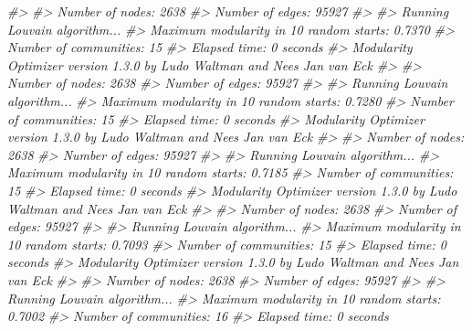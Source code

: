 \documentclass[
]{book}
\newenvironment{Shaded}{\begin{snugshade}}{\end{snugshade}}
\newcommand{\CommentTok}[1]{\textcolor[rgb]{0.56,0.35,0.01}{\textit{#1}}}
\begin{document}
\begin{Shaded}
\begin{Highlighting}[]
\CommentTok{\#\textgreater{} }
\CommentTok{\#\textgreater{} Number of nodes: 2638}
\CommentTok{\#\textgreater{} Number of edges: 95927}
\CommentTok{\#\textgreater{} }
\CommentTok{\#\textgreater{} Running Louvain algorithm...}
\CommentTok{\#\textgreater{} Maximum modularity in 10 random starts: 0.7370}
\CommentTok{\#\textgreater{} Number of communities: 15}
\CommentTok{\#\textgreater{} Elapsed time: 0 seconds}
\CommentTok{\#\textgreater{} Modularity Optimizer version 1.3.0 by Ludo Waltman and Nees Jan van Eck}
\CommentTok{\#\textgreater{} }
\CommentTok{\#\textgreater{} Number of nodes: 2638}
\CommentTok{\#\textgreater{} Number of edges: 95927}
\CommentTok{\#\textgreater{} }
\CommentTok{\#\textgreater{} Running Louvain algorithm...}
\CommentTok{\#\textgreater{} Maximum modularity in 10 random starts: 0.7280}
\CommentTok{\#\textgreater{} Number of communities: 15}
\CommentTok{\#\textgreater{} Elapsed time: 0 seconds}
\CommentTok{\#\textgreater{} Modularity Optimizer version 1.3.0 by Ludo Waltman and Nees Jan van Eck}
\CommentTok{\#\textgreater{} }
\CommentTok{\#\textgreater{} Number of nodes: 2638}
\CommentTok{\#\textgreater{} Number of edges: 95927}
\CommentTok{\#\textgreater{} }
\CommentTok{\#\textgreater{} Running Louvain algorithm...}
\CommentTok{\#\textgreater{} Maximum modularity in 10 random starts: 0.7185}
\CommentTok{\#\textgreater{} Number of communities: 15}
\CommentTok{\#\textgreater{} Elapsed time: 0 seconds}
\CommentTok{\#\textgreater{} Modularity Optimizer version 1.3.0 by Ludo Waltman and Nees Jan van Eck}
\CommentTok{\#\textgreater{} }
\CommentTok{\#\textgreater{} Number of nodes: 2638}
\CommentTok{\#\textgreater{} Number of edges: 95927}
\CommentTok{\#\textgreater{} }
\CommentTok{\#\textgreater{} Running Louvain algorithm...}
\CommentTok{\#\textgreater{} Maximum modularity in 10 random starts: 0.7093}
\CommentTok{\#\textgreater{} Number of communities: 15}
\CommentTok{\#\textgreater{} Elapsed time: 0 seconds}
\CommentTok{\#\textgreater{} Modularity Optimizer version 1.3.0 by Ludo Waltman and Nees Jan van Eck}
\CommentTok{\#\textgreater{} }
\CommentTok{\#\textgreater{} Number of nodes: 2638}
\CommentTok{\#\textgreater{} Number of edges: 95927}
\CommentTok{\#\textgreater{} }
\CommentTok{\#\textgreater{} Running Louvain algorithm...}
\CommentTok{\#\textgreater{} Maximum modularity in 10 random starts: 0.7002}
\CommentTok{\#\textgreater{} Number of communities: 16}
\CommentTok{\#\textgreater{} Elapsed time: 0 seconds}


\end{Highlighting}
\end{Shaded}
\end{document}
